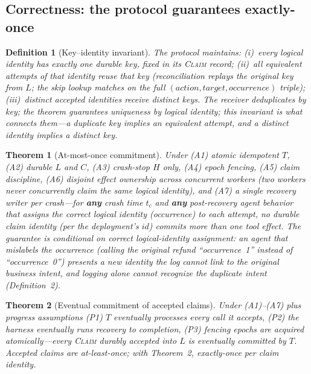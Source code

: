 \documentclass[10pt,journal,compsoc]{IEEEtran}
\newtheorem{theorem}{Theorem}
\newtheorem{definition}{Definition}
\begin{document}
\subsection{Correctness: the protocol guarantees exactly-once}

\begin{definition}[Key--identity invariant]
The protocol maintains: (i)~every logical identity has exactly
one durable key, fixed in its \textsc{Claim} record;
(ii)~all equivalent attempts of that identity reuse that key
(reconciliation replays the original key from $L$; the skip
lookup matches on the full $(\mathit{action}, \mathit{target},
\mathit{occurrence})$ triple); (iii)~distinct accepted
identities receive distinct keys. The receiver deduplicates by
\emph{key}; the theorem guarantees uniqueness by \emph{logical
identity}; this invariant is what connects them---a duplicate
key implies an equivalent attempt, and a distinct identity
implies a distinct key.
\end{definition}

\begin{theorem}[At-most-once commitment]
Under (A1) atomic idempotent $T$, (A2) durable $L$ and $C$,
(A3) crash-stop $H$ only, (A4) epoch fencing, (A5) claim
discipline, (A6) disjoint effect ownership across concurrent
workers (two workers never concurrently claim the same logical
identity), and (A7) a single recovery writer per crash---for
\textbf{any} crash time $t_c$ and \textbf{any} post-recovery
agent behavior \emph{that assigns the correct logical identity
(occurrence) to each attempt}, no durable claim identity (per
the deployment's $\mathit{id}$) commits more than one tool
effect. The guarantee is conditional on correct
logical-identity assignment: an agent that mislabels the
occurrence (calling the original refund ``occurrence~1''
instead of ``occurrence~0'') presents a \emph{new} identity the
log cannot link to the original business intent, and logging
alone cannot recognize the duplicate intent (Definition~2).
\end{theorem}

\begin{theorem}[Eventual commitment of accepted claims]
Under (A1)--(A7) plus progress assumptions (P1) $T$ eventually
processes every call it accepts, (P2) the harness eventually
runs recovery to completion, (P3) fencing epochs are acquired
atomically---every \textsc{Claim} durably accepted into $L$ is
eventually committed by $T$. Accepted claims are at-least-once;
with Theorem~2, exactly-once per claim identity.
\end{theorem}
\end{document}
